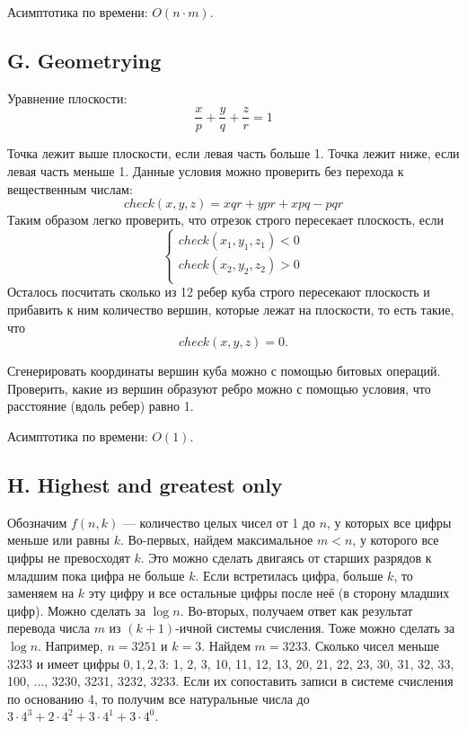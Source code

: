 \documentclass[10pt, a4paper]{article}
\begin{document}
Асимптотика по времени: $O(n \cdot m)$.





\subsection*{G. Geometrying}

Уравнение плоскости:
$$ \frac{x}{p} + \frac{y}{q} + \frac{z}{r} = 1$$

Точка лежит выше плоскости, если левая часть больше 1. Точка лежит ниже, если левая часть меньше 1. Данные условия можно проверить без перехода к вещественным числам:
$$ check(x, y, z) = x q r + y p r + x p q - p q r$$
Таким образом легко проверить, что отрезок строго пересекает плоскость, если
$$
\begin{cases}
check(x_1, y_1, z_1) < 0 \\
check(x_2, y_2, z_2) > 0 \\
\end{cases}
$$
Осталось посчитать сколько из 12 ребер куба строго пересекают плоскость и прибавить к ним количество вершин, которые лежат на плоскости, то есть такие, что
$$check(x, y, z) = 0.$$

Сгенерировать координаты вершин куба можно с помощью битовых операций. Проверить, какие из вершин образуют ребро можно с помощью условия, что расстояние (вдоль ребер) равно 1.

Асимптотика по времени: $O(1)$.





\subsection*{H. Highest and greatest only}

Обозначим $f(n, k)$ --- количество целых чисел от 1 до $n$, у которых все цифры меньше или равны $k$. Во-первых, найдем максимальное $m < n$, у которого все цифры не превосходят $k$. Это можно сделать двигаясь от старших разрядов к младшим пока цифра не больше $k$. Если встретилась цифра, больше $k$, то заменяем на $k$ эту цифру и все остальные цифры после неё (в сторону младших цифр). Можно сделать за $\log n$. Во-вторых, получаем ответ как результат перевода числа $m$ из $(k + 1)$-ичной системы счисления. Тоже можно сделать за $\log n$. Например, $n = 3251$ и $k = 3$. Найдем $m = 3233$. Сколько чисел меньше $3233$ и имеет цифры $0, 1, 2, 3$: 1, 2, 3, 10, 11, 12, 13, 20, 21, 22, 23, 30, 31, 32, 33, 100, ..., 3230, 3231, 3232, 3233. Если их сопоставить записи в системе счисления по основанию 4, то получим все натуральные числа до $3 \cdot 4^3 + 2 \cdot 4^2 + 3 \cdot 4^1 + 3 \cdot 4^0$.
\end{document}
